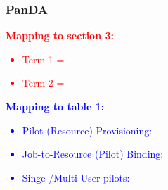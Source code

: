 \documentclass{sig-alternate}
\begin{document}

%
\subsubsection{PanDA}

\textcolor{red}
{
\textbf{Mapping to section 3:}
\begin{itemize}
\item Term 1 =
\item Term 2 =
\end{itemize}
}

\textcolor{blue}
{
\textbf{Mapping to table 1:}
\begin{itemize}
\item Pilot (Resource) Provisioning:
\item Job-to-Resource (Pilot) Binding:
\item Singe-/Multi-User pilots:
\end{itemize}
}
\end{document}
